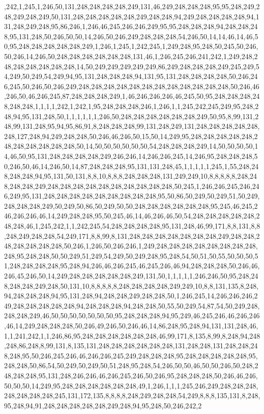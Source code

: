 ,242,1,245,1,246,50,131,248,248,248,248,249,131,46,249,248,248,248,95,95,248,249,248,249,248,249,50,131,248,248,248,248,248,249,248,248,94,249,248,248,248,248,94,131,248,249,248,95,86,246,1,246,46,245,246,246,249,95,95,248,248,248,94,248,248,248,95,131,248,50,246,50,50,14,246,50,246,249,248,248,248,54,246,50,14,14,46,14,46,50,95,248,248,248,248,248,249,1,246,1,245,1,242,245,1,249,248,95,248,50,245,50,246,50,246,14,246,50,248,248,248,248,248,248,131,46,1,246,245,246,241,242,1,249,248,248,248,248,248,248,248,14,50,249,249,249,249,249,86,249,248,248,248,249,245,249,54,249,50,249,54,249,94,95,131,248,248,248,94,131,95,131,248,248,248,248,50,246,246,245,50,246,50,246,249,248,248,248,248,248,248,248,248,248,248,248,248,50,246,46,246,50,46,246,245,87,248,248,248,249,1,46,246,246,246,46,245,50,95,248,248,248,248,248,248,1,1,1,1,242,1,242,1,95,248,248,248,246,1,246,1,1,245,242,245,249,95,248,248,94,95,131,248,50,1,1,1,1,1,1,246,50,248,248,248,248,248,248,249,50,95,8,99,131,248,99,131,248,95,94,95,86,91,8,248,248,248,99,131,248,249,131,248,248,248,248,248,248,127,248,94,249,248,248,50,246,46,246,50,15,50,14,249,95,248,248,248,248,248,248,248,248,248,248,248,50,14,50,50,50,50,50,50,54,248,248,248,249,14,50,50,50,50,14,46,50,95,131,248,248,248,248,249,246,246,14,246,246,245,14,246,95,248,248,248,50,246,50,46,14,246,50,14,87,248,248,248,95,131,131,248,45,1,1,1,1,1,245,1,55,248,248,248,248,94,95,131,50,131,8,8,10,8,8,8,248,248,248,131,249,249,10,8,8,8,8,8,248,248,248,248,249,248,248,248,248,248,248,248,248,248,248,50,245,1,246,246,245,246,246,249,95,131,248,248,248,248,248,248,248,248,248,95,50,86,50,249,50,249,51,50,249,248,248,248,249,50,249,50,86,50,249,50,50,248,248,248,248,248,248,95,245,46,245,246,246,246,46,14,249,248,248,95,50,245,46,14,46,246,46,50,54,248,248,248,248,248,248,248,46,1,245,242,1,1,242,245,54,248,248,248,248,95,131,248,46,99,171,8,8,131,8,8,248,249,248,248,54,249,171,8,8,99,8,131,248,248,248,248,248,248,248,249,248,248,248,248,248,248,248,50,246,1,246,50,246,246,1,249,248,248,248,248,248,248,248,248,248,95,248,248,50,50,249,51,249,54,249,50,249,248,95,248,54,50,51,50,55,50,50,50,51,248,248,248,248,95,248,94,246,46,246,245,46,245,246,46,94,248,248,248,50,246,46,246,45,246,50,14,249,248,248,248,248,248,249,131,50,1,1,1,1,1,246,246,50,95,248,248,248,248,249,248,50,131,10,8,8,8,8,8,248,248,248,248,249,249,10,8,8,131,135,8,248,94,248,248,248,94,95,131,248,94,248,248,249,248,248,50,1,246,245,14,246,246,246,249,248,248,248,248,248,94,248,248,248,94,248,248,50,55,50,249,54,87,54,50,249,248,248,248,249,46,50,50,50,50,50,50,50,95,248,248,248,94,95,249,46,245,246,46,246,246,46,14,249,248,248,248,50,246,49,246,50,246,46,14,86,248,95,248,94,131,131,248,46,1,1,241,242,1,1,246,86,95,248,248,248,248,248,248,46,99,171,8,135,8,99,8,248,94,248,248,86,248,8,99,131,8,135,131,248,248,248,248,248,248,131,248,248,131,248,248,248,248,95,50,246,245,246,46,246,246,245,249,248,248,248,95,248,248,248,248,248,95,248,248,50,86,54,50,249,50,249,50,51,248,95,248,54,246,50,50,46,50,50,246,50,248,248,248,248,95,131,248,246,246,46,246,245,246,50,246,95,248,248,248,50,246,46,246,50,50,50,14,249,95,248,248,248,248,248,248,49,1,246,1,1,1,245,246,249,248,248,248,248,248,248,248,245,131,172,135,8,8,8,8,248,249,248,248,54,249,8,8,8,135,131,8,248,95,248,94,91,248,248,248,248,248,249,248,94,95,248,50,246,242,2